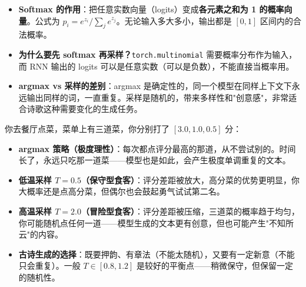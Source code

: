 \documentclass[a4paper,11pt]{ctexart}
\begin{document}
\begin{beginnerbox}
    \begin{itemize}
        \item \textbf{Softmax 的作用}：把任意实数向量（logits）变成\textbf{各元素之和为 1 的概率向量}。公式为 $p_i = e^{z_i} / \sum_j e^{z_j}$。无论输入多大多小，输出都是 $[0,1]$ 区间内的合法概率。
        \item \textbf{为什么要先 softmax 再采样？}\texttt{torch.multinomial} 需要概率分布作为输入，而 RNN 输出的 logits 可以是任意实数（可以是负数），不能直接当概率用。
        \item \textbf{argmax vs 采样的差别}：argmax 是确定性的，同一个模型在同样上下文下永远输出同样的词，一直重复。采样是随机的，带来多样性和"创意感"，非常适合诗歌这种需要变化的生成任务。
    \end{itemize}
\end{beginnerbox}

\begin{metaphorbox}
    你去餐厅点菜，菜单上有三道菜，你分别打了 $[3.0, 1.0, 0.5]$ 分：

    \begin{itemize}
        \item \textbf{argmax 策略（极度理性）}：每次都点评分最高的那道，从不尝试别的。时间长了，永远只吃那一道菜——模型也是如此，会产生极度单调重复的文本。
        \item \textbf{低温采样 $T=0.5$（保守型食客）}：评分差距被放大，高分菜的优势更明显，你大概率还是点高分菜，但偶尔也会鼓起勇气试试第二名。
        \item \textbf{高温采样 $T=2.0$（冒险型食客）}：评分差距被压缩，三道菜的概率趋于均匀，你可能随机点任何一道——模型生成的文本更有创意，但也可能产生"不知所云"的内容。
        \item \textbf{古诗生成的选择}：既要押韵、有章法（不能太随机），又要有一定新意（不能只会重复）。一般 $T \in [0.8, 1.2]$ 是较好的平衡点——稍微保守，但保留一定的随机性。
    \end{itemize}
\end{metaphorbox}
\end{document}
